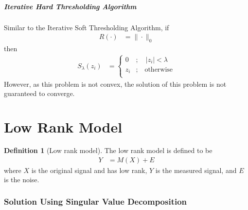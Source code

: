 \documentclass[titlepage, fleqn, a4paper, 12pt, twoside]{article}
\theoremstyle{definition}
\newtheorem{definition}{Definition}
\theoremstyle{theorem}
\begin{document}
\subsubsection{Iterative Hard Thresholding Algorithm}

Similar to the Iterative Soft Thresholding Algorithm, if
\begin{align*}
	R(\cdot) &= \|\cdot\|_0
\end{align*}
then
\begin{align*}
	S_{\lambda}(z_i) &=
		\begin{cases}
			0 &;\quad |z_i| < \lambda\\
			z_i &;\quad \text{otherwise}\\
		\end{cases}
\end{align*}
However, as this problem is not convex, the solution of this problem is not guaranteed to converge.

\clearpage
\part{Low Rank Model}

\begin{definition}[Low rank model]
	The low rank model is defined to be
	\begin{align*}
		Y &= M(X) + E
	\end{align*}
	where $X$ is the original signal and has low rank, $Y$ is the measured signal, and $E$ is the noise.
\end{definition}

\section{Solution Using Singular Value Decomposition}
\end{document}
